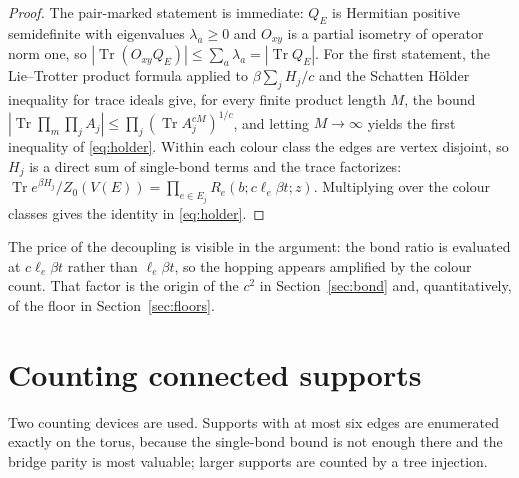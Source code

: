 \documentclass[11pt]{article}
\theoremstyle{plain}
\theoremstyle{definition}
\DeclareMathOperator{\Tr}{Tr}
\begin{document}
\begin{proof}
The pair-marked statement is immediate: $Q_E$ is Hermitian positive semidefinite with
eigenvalues $\lambda_a\ge0$ and $O_{xy}$ is a partial isometry of operator norm one,
so $|\Tr(O_{xy}Q_E)|\le\sum_a\lambda_a=|\Tr Q_E|$. For the first statement, the
Lie--Trotter product formula \cite{trotter1959} applied to
$\beta\sum_jH_j/c$ and the Schatten H\"older inequality for trace ideals give, for
every finite product length $M$, the bound
$|\Tr\prod_{m}\prod_{j}A_j|\le\prod_{j}(\Tr A_j^{cM})^{1/c}$, and letting $M\to\infty$
yields the first inequality of \eqref{eq:holder}. Within each colour class the edges
are vertex disjoint, so $H_j$ is a direct sum of single-bond terms and the
trace factorizes: $\Tr e^{\beta H_j}/Z_0(V(E))=\prod_{e\in E_j}R_e(b;c\ell_e\beta
t;z)$. Multiplying over the colour classes gives the identity in
\eqref{eq:holder}.
\end{proof}

The price of the decoupling is visible in the argument: the bond ratio is evaluated
at $c\ell_e\beta t$ rather than $\ell_e\beta t$, so the hopping appears amplified by
the colour count. That factor is the origin of the $c^{2}$ in
Section~\ref{sec:bond} and, quantitatively, of the floor in
Section~\ref{sec:floors}.

\section{Counting connected supports}\label{sec:counting}

Two counting devices are used. Supports with at most six edges are enumerated exactly
on the torus, because the single-bond bound is not enough there and the bridge parity
is most valuable; larger supports are counted by a tree injection.
\end{document}
